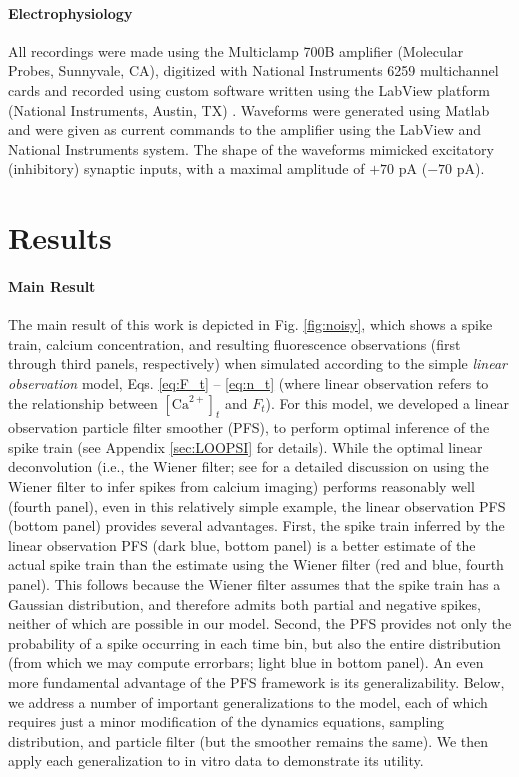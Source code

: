\documentclass[10pt]{article}
\newcommand{\Ca}{[\text{Ca}^{2+}]}
\begin{document}
\paragraph{Electrophysiology}

All recordings were made using the Multiclamp 700B amplifier (Molecular Probes, Sunnyvale, CA), digitized with National Instruments 6259 multichannel cards and recorded using custom software written using the LabView platform (National Instruments, Austin, TX) .  Waveforms were generated using Matlab and were given as current commands to the amplifier using the LabView and National Instruments system. The shape of the waveforms mimicked excitatory (inhibitory) synaptic inputs, with a maximal amplitude of $+70$ pA ($-70$ pA).

\section*{Results} \label{sec:results}

\paragraph{Main Result}

The main result of this work is depicted in Fig. \ref{fig:noisy}, which shows a spike train, calcium concentration, and resulting fluorescence observations (first through third panels, respectively) when simulated according to the simple \emph{linear observation} model, Eqs. \ref{eq:F_t} -- \ref{eq:n_t} (where linear observation refers to the relationship between $\Ca_t$ and $F_t$). For this model, we developed a linear observation particle filter smoother (PFS), to perform optimal inference of the spike train (see Appendix \ref{sec:LOOPSI} for details).  While the optimal linear deconvolution (i.e., the Wiener filter; see \cite{HolekampHoly08} for a detailed discussion on using the Wiener filter to infer spikes from calcium imaging) performs reasonably well (fourth panel), even in this relatively simple example, the linear observation PFS (bottom panel) provides several advantages.  First, the spike train inferred by the linear observation PFS (dark blue, bottom panel) is a better estimate of the actual spike train than the estimate using the Wiener filter (red and blue, fourth panel). This follows because the Wiener filter assumes that the spike train has a Gaussian distribution, and therefore admits both partial and negative spikes, neither of which are possible in our model. Second, the PFS provides not only the probability of a spike occurring in each time bin, but also the entire distribution (from which we may compute errorbars; light blue in bottom panel). An even more fundamental advantage of the PFS framework is its generalizability. Below, we address a number of important generalizations to the model, each of which requires just a minor modification of the dynamics equations, sampling distribution, and particle filter (but the smoother remains the same). We then apply each generalization to in vitro data to demonstrate its utility.
\end{document}
